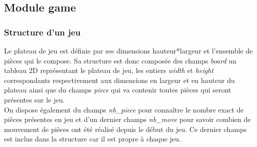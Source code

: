 \documentclass{report}
\begin{document}
\subsection{Module game}
\subsubsection{Structure d'un jeu}
Le plateau de jeu est définie par ses dimensions hauteur*largeur et l'ensemble de pièces qui le compose. Sa structure est donc composée des champs \textit{board} un tableau 2D représentant le plateau de jeu, les entiers \textit{width} et \textit{height} correspondants respectivement aux dimensions en largeur et en hauteur du plateau ainsi que du champs \textit{piece} qui va contenir toutes pièces qui seront présentes sur le jeu. \\
On dispose également du champs \textit{nb\_piece} pour connaître le nombre exact de pièces présentes en jeu et d'un dernier champs \textit{nb\_move} pour savoir combien de mouvement de pièces ont été réalisé depuis le début du jeu. Ce dernier champs est inclus dans la structure car il est propre à chaque jeu.
\end{document}
